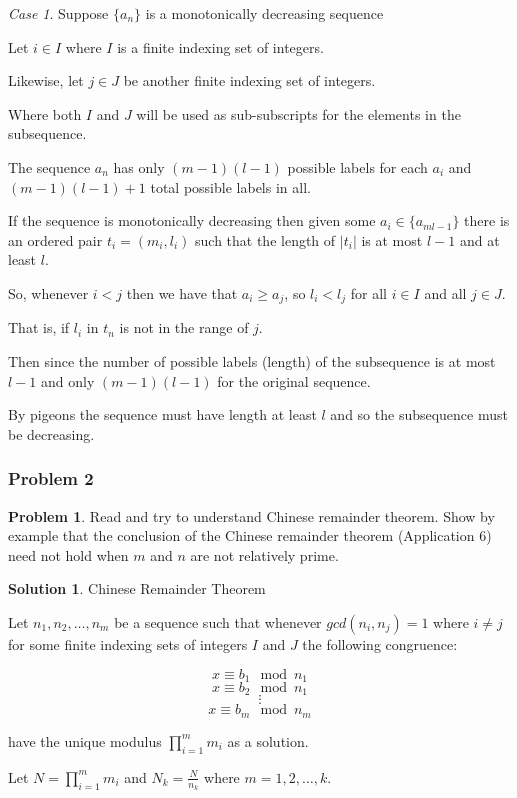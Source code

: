 \documentclass[10pt,a4paper,titlepage,twoside,draft]{article}
\theoremstyle{plain}
\theoremstyle{definition}
\newtheorem*{prob}{Problem}
\newtheorem*{sol}{Solution}
\theoremstyle{remark}
\newtheorem{case}{Case}
\begin{document}
\medskip
 
\begin{case}
Suppose $\{a_{n}\}$ is a monotonically decreasing sequence
   
Let $i \in I$ where $I$ is a finite indexing set of integers.
   
Likewise, let $j \in J$ be another finite indexing set of integers. 
   
Where both $I$ and $J$ will be used as sub-subscripts for the elements in the subsequence. 
   
The sequence $a_{n}$ has only $(m-1)(l-1)$ possible labels for each $a_{i}$ and $(m-1)(l-1)+1$ total possible labels in all.
  
If the sequence is monotonically decreasing then given some $a_{i} \in \{a_{ml-1}\}$ there is an ordered pair $t_{i} = (m_{i}, l_{i})$ such that the length of $|t_{i}|$ is at most $l-1$ and at least $l$.
    
So, whenever $i < j$ then we have that $a_{i} \geq a_{j}$, so $l_{i} < l_{j}$ for all $i \in I$ and all $j \in J$.
   
That is, if $l_{i}$ in $t_{n}$ is not in the range of $j$.
   
Then since the number of possible labels (length) of the subsequence is at most $l-1$ and only $(m-1)(l-1)$ for the original sequence. 
   
By pigeons the sequence must have length at least $l$ and so the subsequence must be decreasing.
\end{case}
  


\subsubsection{Problem 2}

\begin{prob}
Read and try to understand Chinese remainder theorem.
Show by example that the conclusion of the Chinese remainder theorem
(Application 6) need not hold when $m$ and $n$ are not relatively prime.
\end{prob}

\medskip

\begin{sol}{Chinese Remainder Theorem}

Let $n_{1},n_{2},\ldots,n_{m}$ be a sequence such that whenever $gcd(n_{i},n_{j}) =1$ where $i \neq j$ for some finite indexing sets of integers $I$ and $J$ the following congruence:
     
\[x \equiv  b_{1}\mod{n}_{1}\]
\[x \equiv  b_{2}\mod{n}_{1}\]
\[\vdots\]                       
\[x \equiv  b_{m}\mod{n}_{m}\]
    
have the unique modulus $\prod_{i=1}^{m} m_{i}$ as a solution.

Let $N = \prod_{i=1}^{m} m_{i}$ and $N_{k} = \frac{N}{n_{k}}$ where $m = {1,2, \ldots, k}$.
\end{sol}
\end{document}
